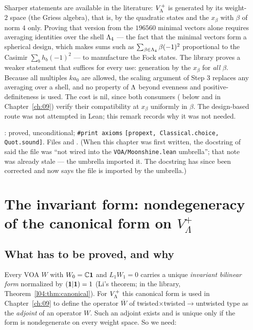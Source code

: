 \begin{remark}\label{ch04:rem:design}
Sharper statements are available in the literature: $V_{\Lambda}^+$ is generated by its weight-$2$
space (the Griess algebra), that is, by the quadratic states and the $x_\beta$ with $\beta$ of norm $4$
only. Proving that version from the $196560$ minimal vectors alone requires averaging identities over
the shell ${\Lambda}_4$ --- the fact that the minimal vectors form a spherical design, which makes sums
such as $\sum_{\beta\in{\Lambda}_4}\beta(-1)^2$ proportional to the Casimir $\sum_bh_b(-1)^2$ --- to manufacture
the Fock states. The library proves a weaker statement that suffices for every use: generation by the
$x_\beta$ for \emph{all} $\beta$. Because all multiples $ka_0$ are allowed, the scaling argument of Step 3
replaces any averaging over a shell, and no property of ${\Lambda}$ beyond evenness and
positive-definiteness is used. The cost is nil, since both consumers ( below
and  in Chapter~\ref{ch:09}) verify their compatibility at $x_\beta$ uniformly
in $\beta$. The design-based route was not attempted in Lean; this remark records why it was not needed.
\end{remark}

\begin{status}
: proved, unconditional; \texttt{\#print axioms}
\texttt{[propext, Classical.choice, Quot.sound]}. Files 
and . (When this chapter was first written, the docstring of  said the file
was ``not wired into the \texttt{VOA/Moonshine.lean} umbrella''; that note was already stale --- the umbrella
imported it. The docstring has since been corrected and now says the file is imported by the umbrella.)
\end{status}
\section{The invariant form: nondegeneracy of the canonical form on \texorpdfstring{$V_\Lambda^+$}{V+}}\label{ch04:sec:form}

\subsection{What has to be proved, and why}

Every VOA $W$ with $W_0={\mathbb{C}}\mathbf{1}$ and $L_1W_1=0$ carries a unique \emph{invariant bilinear form}
normalized by $(\mathbf{1}|\mathbf{1})=1$ (Li's theorem; in the library, Theorem~\ref{l04:thm:canonical}). For
$V_{\Lambda}^+$ this canonical form is used in Chapter~\ref{ch:09} to define the operator $\overline W$ of
twisted$\times$twisted$\to$untwisted type as the \emph{adjoint} of an operator $W$. Such an adjoint
exists and is unique only if the form is nondegenerate on every weight space. So we need:

